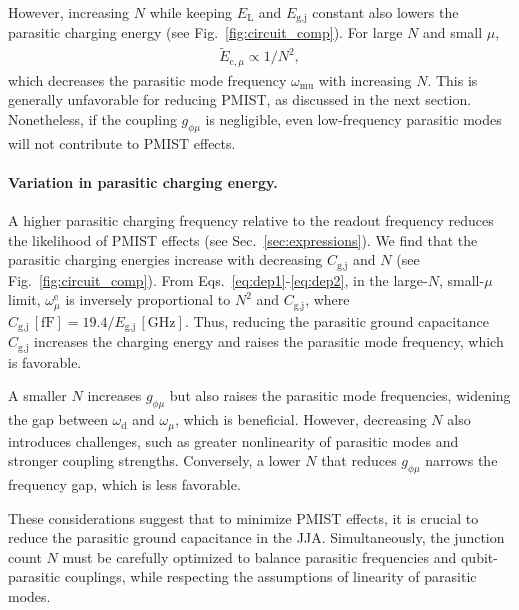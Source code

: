 \documentclass[%
reprint,
superscriptaddress,
 amsmath,amssymb,
 aps,
 prx,
longbibliography,
floatfix,
]{revtex4-2}
\begin{document}
However, increasing \( N \) while keeping \( E_\textrm{L} \) and \( E_\textrm{g,j} \) constant also lowers the parasitic charging energy (see Fig.~\ref{fig:circuit_comp}). For large \( N \) and small \( \mu \),
\begin{align}
 \tilde{E}_{\textrm{c},\mu} \propto 1/N^2,\label{eq:dep2}
\end{align}
which decreases the parasitic mode frequency \( \omega_\textrm{mu} \) with increasing \( N \). This is generally unfavorable for reducing PMIST, as discussed in the next section. Nonetheless, if the coupling \( g_{\phi\mu} \) is negligible, even low-frequency parasitic modes will not contribute to PMIST effects.
\paragraph{Variation in parasitic charging energy.}\label{par-freq} 
A higher parasitic charging frequency relative to the readout frequency reduces the likelihood of PMIST effects (see Sec.~\ref{sec:expressions}). We find that the parasitic charging energies increase with decreasing \( C_\textrm{g,j} \) and \( N \) (see Fig.~\ref{fig:circuit_comp}). From Eqs.~\ref{eq:dep1}-\ref{eq:dep2}, in the large-\( N \), small-\( \mu \) limit, \( \omega_\mu^\textrm{e} \) is inversely proportional to \( N^2 \) and \( C_\textrm{g,j} \), where \( C_\textrm{g,j} \, [\mathrm{fF}] = 19.4 / E_\textrm{g,j} \, [\mathrm{GHz}] \). Thus, reducing the parasitic ground capacitance \( C_\textrm{g,j} \) increases the charging energy and raises the parasitic mode frequency, which is favorable.

A smaller \( N \) increases \( g_{\phi\mu} \) but also raises the parasitic mode frequencies, widening the gap between \( \omega_\textrm{d} \) and \( \omega_\mu \), which is beneficial. However, decreasing \( N \) also introduces challenges, such as greater nonlinearity of parasitic modes and stronger coupling strengths. Conversely, a lower \( N \) that reduces \( g_{\phi\mu} \) narrows the frequency gap, which is less favorable.

These considerations suggest that to minimize PMIST effects, it is crucial to reduce the parasitic ground capacitance in the JJA. Simultaneously, the junction count \( N \) must be carefully optimized to balance parasitic frequencies and qubit-parasitic couplings, while respecting the assumptions of linearity of parasitic modes.
\end{document}
